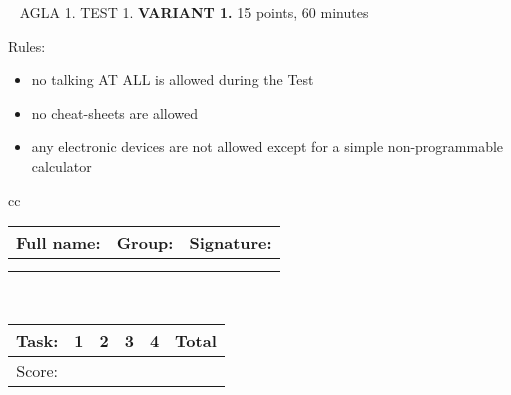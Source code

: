 \documentclass[]{exam}
\date{}
\begin{document}
 

\addpoints
\
\centering
AGLA 1. TEST 1. \textbf{VARIANT 1.} 15 points, 60 minutes
\bigskip

Rules:
\begin{itemize}
    \item no talking AT ALL is allowed during the Test
    \item no cheat-sheets are allowed
    \item any electronic devices are not allowed except for a simple non-programmable calculator  
\end{itemize}

\begin{tabular}{cc}
    \begin{tabular}[b]{|p{11cm}|c|c|}
    \hline
    Full name: & Group: & Signature:\\ \hline
     & & \\ 
     & & \\
     \hline
    \end{tabular}
\\

    \begin{tabular}[b]{|c|c|c|c|c|c|}
    \hline
    Task: & 1 & 2 & 3 & 4 &  Total \\ \hline

    Score: & &  & &  &   \\ \hline
    \end{tabular}
\end{tabular}
\end{document}
